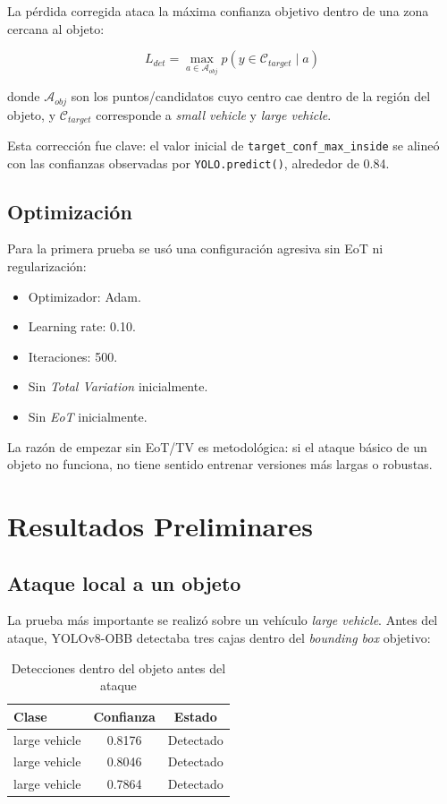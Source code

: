 \documentclass[12pt,a4paper]{article}
\begin{document}
La pérdida corregida ataca la máxima confianza objetivo dentro de una zona cercana al objeto:

\begin{equation}
L_{det} = \max_{a \in \mathcal{A}_{obj}} p(y \in \mathcal{C}_{target} \mid a)
\end{equation}

donde $\mathcal{A}_{obj}$ son los puntos/candidatos cuyo centro cae dentro de la región del objeto, y $\mathcal{C}_{target}$ corresponde a \textit{small vehicle} y \textit{large vehicle}.

Esta corrección fue clave: el valor inicial de \texttt{target\_conf\_max\_inside} se alineó con las confianzas observadas por \texttt{YOLO.predict()}, alrededor de 0.84.

\subsection{Optimización}

Para la primera prueba se usó una configuración agresiva sin EoT ni regularización:

\begin{itemize}
    \item Optimizador: Adam.
    \item Learning rate: 0.10.
    \item Iteraciones: 500.
    \item Sin \textit{Total Variation} inicialmente.
    \item Sin \textit{EoT} inicialmente.
\end{itemize}

La razón de empezar sin EoT/TV es metodológica: si el ataque básico de un objeto no funciona, no tiene sentido entrenar versiones más largas o robustas.

\section{Resultados Preliminares}

\subsection{Ataque local a un objeto}

La prueba más importante se realizó sobre un vehículo \textit{large vehicle}. Antes del ataque, YOLOv8-OBB detectaba tres cajas dentro del \textit{bounding box} objetivo:

\begin{table}[h]
\centering
\caption{Detecciones dentro del objeto antes del ataque}
\begin{tabular}{lcc}
\toprule
Clase & Confianza & Estado \\
\midrule
large vehicle & 0.8176 & Detectado \\
large vehicle & 0.8046 & Detectado \\
large vehicle & 0.7864 & Detectado \\
\bottomrule
\end{tabular}
\end{table}
\end{document}
